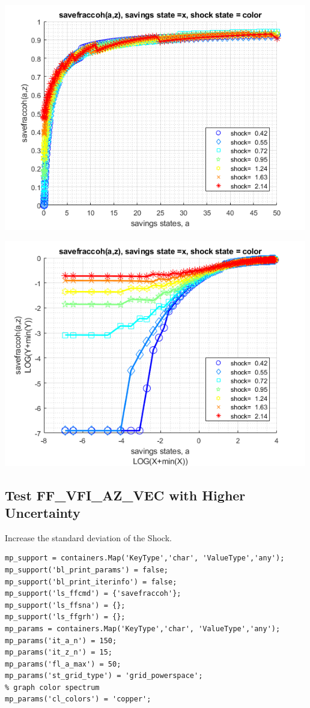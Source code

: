 \documentclass[
]{book}
\begin{document}
\includegraphics[width=5.20833in,height=\textheight]{img/fx_vfi_az_vec_images/figure_4.png}

\includegraphics[width=5.20833in,height=\textheight]{img/fx_vfi_az_vec_images/figure_5.png}

\hypertarget{test-ff_vfi_az_vec-with-higher-uncertainty}{%
\subsection{Test FF\_VFI\_AZ\_VEC with Higher Uncertainty}\label{test-ff_vfi_az_vec-with-higher-uncertainty}}

Increase the standard deviation of the Shock.

\begin{verbatim}
mp_support = containers.Map('KeyType','char', 'ValueType','any');
mp_support('bl_print_params') = false;
mp_support('bl_print_iterinfo') = false;
mp_support('ls_ffcmd') = {'savefraccoh'};
mp_support('ls_ffsna') = {};
mp_support('ls_ffgrh') = {};
mp_params = containers.Map('KeyType','char', 'ValueType','any');
mp_params('it_a_n') = 150;
mp_params('it_z_n') = 15;
mp_params('fl_a_max') = 50;
mp_params('st_grid_type') = 'grid_powerspace';
% graph color spectrum
mp_params('cl_colors') = 'copper';
\end{verbatim}
\end{document}
